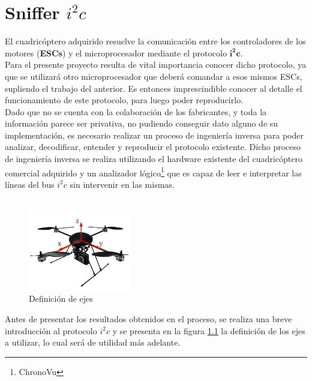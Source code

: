 \documentclass[main]{subfiles}
\begin{document}
\chapter{Sniffer $i^2c$}

El cuadricóptero adquirido resuelve la comunicación entre los controladores de los motores (\textbf{ESCs}) y el microprocesador mediante el protocolo $\mathbf{i^2c}$.\\

Para el presente proyecto resulta de vital importancia conocer dicho protocolo, ya que se utilizará otro microprocesador que deberá comandar a esos mismos ESCs, supliendo el trabajo del anterior. Es entonces imprescindible conocer al detalle el funcionamiento de este protocolo, para luego poder reproducirlo.\\

Dado que no se cuenta con la colaboración de los fabricantes, y toda la información parece ser privativa, no pudiendo conseguir dato alguno de su implementación, es necesario realizar un proceso de ingeniería inversa para poder analizar, decodificar, entender y reproducir el protocolo existente. Dicho proceso de ingeniería inversa se realiza utilizando el hardware existente del cuadricóptero comercial adquirido y un analizador lógico\footnote{ChronoVu} que es capaz de leer e interpretar las líneas del bus $i^2c$ sin intervenir en las mismas.\\ \\

\begin{figure}
	\vspace{-40pt}
	\begin{center}
	\includegraphics[width=0.4\textwidth]{./pics_sniffer/ejes_quad.jpg}
	\end{center}
	\vspace{-20pt}
	\caption{Definición de ejes}
	\label{fig:ejes_quad}
	\vspace{-70pt}
\end{figure}

Antes de presentar los resultados obtenidos en el proceso, se realiza una breve introducción al protocolo $i^2c$ y se presenta en la figura \ref{fig:ejes_quad} la definición de los ejes a utilizar, lo cual será de utilidad más adelante.
\end{document}
